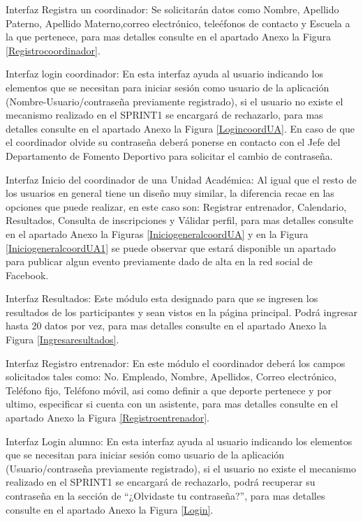 	\noindent Interfaz Registra un coordinador: Se solicitarán datos como Nombre, Apellido Paterno, Apellido Materno,correo electrónico, teleéfonos de contacto y Escuela a la que pertenece, para mas detalles consulte en el apartado Anexo la Figura \ref{Registrocoordinador}.
	\pagebreak
	
	\noindent Interfaz login coordinador: En esta interfaz ayuda al usuario indicando los elementos que se necesitan para iniciar sesión como usuario de la aplicación (Nombre-Usuario/contraseña previamente registrado), si el usuario no existe el mecanismo realizado en el SPRINT1 se encargará de rechazarlo, para mas detalles consulte en el apartado Anexo la Figura \ref{LogincoordUA}. En caso de que el coordinador olvide su contraseña deberá ponerse en contacto con el Jefe del Departamento de Fomento Deportivo para solicitar el cambio de contraseña.
	\newline
	
	\noindent Interfaz  Inicio del coordinador de una Unidad Académica: Al igual que el resto de los usuarios en general tiene un diseño muy similar, la diferencia recae en las opciones que puede realizar, en este caso son: Registrar entrenador, Calendario, Resultados, Consulta de inscripciones y Válidar perfil, para mas detalles consulte en el apartado Anexo la Figuras 	\ref{IniciogeneralcoordUA} y en la Figura \ref{IniciogeneralcoordUA1} se puede observar que estará disponible un apartado para publicar algun evento previamente dado de alta en la red social de Facebook.
	\newline
	
	\noindent Interfaz Resultados: Este módulo esta designado para que se ingresen los resultados de los participantes y sean vistos en la página principal. Podrá ingresar hasta 20 datos por vez, para mas detalles consulte en el apartado Anexo la Figura \ref{Ingresaresultados}.
	\newline
	
	\noindent Interfaz Registro entrenador: En este  módulo el coordinador deberá los campos solicitados tales como: No. Empleado, Nombre, Apellidos, Correo electrónico, Teléfono fijo, Teléfono móvil, asi como definir a que deporte pertenece y por ultimo, especificar si cuenta con un asistente, para mas detalles consulte en el apartado Anexo la Figura \ref{Registroentrenador}.
	\newline
	
	\noindent Interfaz Login alumno: En esta interfaz ayuda al usuario indicando los elementos que se necesitan para iniciar sesión como usuario de la aplicación (Usuario/contraseña previamente registrado), si el usuario no existe el mecanismo realizado en el SPRINT1 se encargará de rechazarlo, podrá recuperar su contraseña en la sección de “¿Olvidaste tu contraseña?”, para mas detalles consulte en el apartado Anexo la Figura \ref{Login}.
	\newline
	
